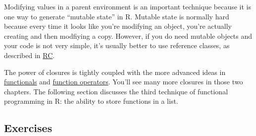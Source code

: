 \begin{Shaded}
\begin{Highlighting}[]
\StringTok{ }
\StringTok{ }
  \StringTok{ }\StringTok{ }
\NormalTok{\}}
\StringTok{ }
  \StringTok{ }
    \StringTok{ }\StringTok{ }
  \NormalTok{\}}
\NormalTok{\}}
\end{Highlighting}
\end{Shaded}

Modifying values in a parent environment is an important technique
because it is one way to generate ``mutable state'' in R. Mutable state
is normally hard because every time it looks like you're modifying an
object, you're actually creating and then modfiying a copy. However, if
you do need mutable objects and your code is not very simple, it's
usually better to use reference classes, as described in
\hyperref[rc]{RC}.

The power of closures is tightly coupled with the more advanced ideas in
\hyperref[functionals]{functionals} and
\hyperref[function-operators]{function operators}. You'll see many more
closures in those two chapters. The following section discusses the
third technique of functional programming in R: the ability to store
functions in a list.

\subsection{Exercises}

